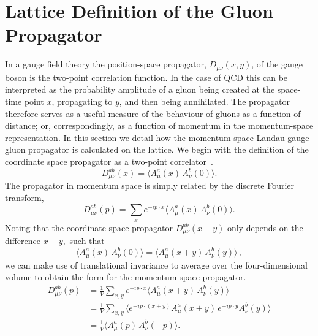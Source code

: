 \section{Lattice Definition of the Gluon Propagator}
In a gauge field theory the position-space propagator, $D_{\mu\nu}(x,y)$, of the gauge boson is the two-point correlation function. In the case of QCD this can be interpreted as the probability amplitude of a gluon being created at the space-time point $x$, propagating to $y$, and then being annihilated. The propagator therefore serves as a useful measure of the behaviour of gluons as a function of distance; or, correspondingly, as a function of momentum in the momentum-space representation. In this section we detail how the momentum-space Landau gauge gluon propagator is calculated on the lattice. We begin with the definition of the coordinate space propagator as a two-point correlator~\cite{Zwanziger:1991gz,Cucchieri:1999sz,Langfeld:2001cz}.
\begin{equation}
D^{ab}_{\mu\nu}(x) = \langle A^a_\mu(x) \, A^b_\nu(0)\rangle.
\label{eq:coordGluonProp}
\end{equation}
The propagator in momentum space is simply related by the discrete Fourier transform,
\begin{equation}
D^{ab}_{\mu\nu}(p) = \sum_x e^{-ip\cdot x} \langle A^a_\mu(x) \, A^b_\nu(0) \rangle. 
\end{equation}
Noting that the coordinate space propagator $D^{ab}_{\mu\nu}(x-y)$ only depends on the difference $x-y,$ such that
\begin{equation}
\langle A^a_\mu(x) \, A^b_\nu(0)\rangle = \langle A^a_\mu(x+y) \, A^b_\nu(y)\rangle\, ,
\end{equation}
we can make use of translational invariance to average over the four-dimensional volume to obtain the form for the momentum space propagator.
\begin{align}
D^{ab}_{\mu\nu}(p) &= \frac{1}{V}\sum_{x,y} e^{-ip\cdot x}\langle A^a_\mu(x+y) \, A^b_\nu(y) \rangle \nonumber \\
                &= \frac{1}{V}\sum_{x,y} \langle e^{-ip\cdot (x+y)} A^a_\mu(x+y) \, e^{+ip\cdot y}A^b_\nu(y) \rangle \nonumber \\
                &= \frac{1}{V}\langle A^a_\mu(p) \, A^b_\nu(-p) \rangle. \label{eq:gluPropxtop}
\end{align}

